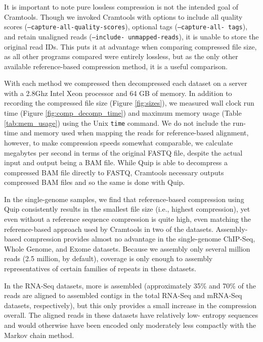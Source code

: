 \documentclass[twocolumn]{article}
\begin{document}

It is important to note pure lossless compression is not the intended goal of
Cramtools. Though we invoked Cramtools with options to include all quality
scores (\texttt{--capture-all-quality-scores}), optional tags (\texttt
{--capture-all- tags}), and retain unaligned reads (\texttt{--include-
unmapped-reads}), it is unable to store the original read IDs. This puts it at
advantage when comparing compressed file size, as all other programs compared
were entirely lossless, but as the only other available reference-based
compression method, it is a useful comparison.


With each method we compressed then decompressed each dataset on a server with
a 2.8Ghz Intel Xeon processor and 64 GB of memory. In addition to recording
the compressed file size (Figure \ref{fig:sizes}), we measured wall clock run
time (Figure \ref{fig:comp_decomp_time}) and maximum memory usage (Table
\ref{tab:mem_usage}) using the Unix \texttt{time} command. We do not include
the run-time and memory used when mapping the reads for reference-based
alignment, however, to make compression speeds somewhat comparable, we
calculate megabytes per second in terms of the original FASTQ file, despite
the actual input and output being a BAM file. While Quip is able to decompress
a compressed BAM file directly to FASTQ, Cramtools necessary outputs
compressed BAM files and so the same is done with Quip.

In the single-genome samples, we find that reference-based compression using
Quip consistently results in the smallest file size (i.e., highest
compression), yet even without a reference sequence compression is quite high,
even matching the reference-based approach used by Cramtools in two of the
datasets. Assembly-based compression provides almost no advantage in the
single-genome ChIP-Seq, Whole Genome, and Exome datasets. Because we assembly
only several million reads (2.5 million, by default), coverage is only enough
to assembly representatives of certain families of repeats in these datasets.

In the RNA-Seq datasets, more is assembled (approximately 35\% and 70\% of the
reads are aligned to assembled contigs in the total RNA-Seq and mRNA-Seq
datasets, respectively), but this only provides a small increase in the
compression overall. The aligned reads in these datasets have relatively low-
entropy sequences and would otherwise have been encoded only moderately less
compactly with the Markov chain method.
\end{document}
